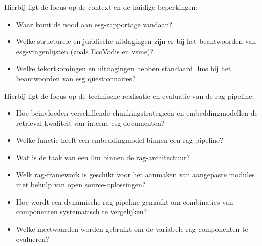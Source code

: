 \begin{description}
  \item[]
  \item Hierbij ligt de focus op de context en de huidige beperkingen:
  \begin{itemize}
    \item \label{dv:nood-esg} Waar komt de nood aan \gls{esg}-rapportage vandaan?
    \item \label{dv:esg-uitdagingen} Welke structurele en juridische uitdagingen zijn er bij het beantwoorden van \gls{esg}-vragenlijsten (zoals EcoVadis en \gls{vsme})?
    \item \label{dv:llm-tekortkomingen} Welke tekortkomingen en uitdagingen hebben standaard \glspl{llm} bij het beantwoorden van \gls{esg} questionnaires?
  \end{itemize}

  \item[\IfLanguageName{dutch}{Het oplossingsdomein}{The solution domain}]
  \item Hierbij ligt de focus op de technische realisatie en evaluatie van de \gls{rag}-pipeline:
  \begin{itemize}
    \item \label{dv:chunking-retrieval} Hoe beïnvloeden verschillende chunkingstrategieën en embeddingmodellen de retrieval-kwaliteit van interne \gls{esg}-documenten?
    \item \label{dv:embedding-functie} Welke functie heeft een embeddingmodel binnen een \gls{rag}-pipeline?
    \item \label{dv:llm-taak} Wat is de taak van een \gls{llm} binnen de \gls{rag}-architectuur?
    \item \label{dv:rag-framework} Welk \gls{rag}-framework is geschikt voor het aanmaken van aangepaste modules met behulp van open source-oplossingen?
    \item \label{dv:dynamische-pipeline} Hoe wordt een dynamische \gls{rag}-pipeline gemaakt om combinaties van componenten systematisch te vergelijken?
    \item \label{dv:meetwaarden} Welke meetwaarden worden gebruikt om de variabele \gls{rag}-componenten te evalueren?
  \end{itemize}
\end{description}

\section{}%
\label{sec:onderzoeksdoelstelling}

